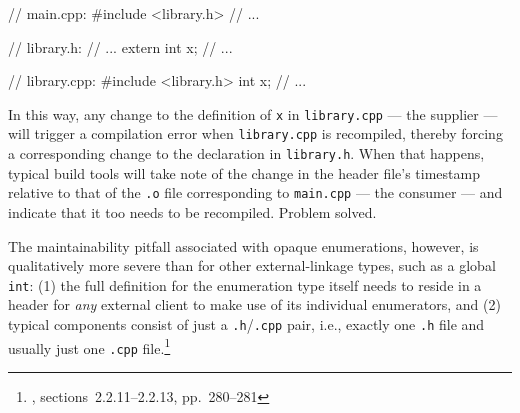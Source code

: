 \noindent\begin{minipage}{.3\textwidth}
\begin{emcppslisting}[emcppsbatch=e10]
// main.cpp:
#include <library.h>
// ...
\end{emcppslisting}
\end{minipage}\hfill
\begin{minipage}{.3\textwidth}
\begin{emcppslisting}[emcppsbatch=e10]
// library.h:
// ...
extern int x;
// ...
\end{emcppslisting}
\end{minipage}
\begin{minipage}{.3\textwidth}
\begin{emcppslisting}[emcppsbatch=e10]
// library.cpp:
#include <library.h>
int x;
// ...
\end{emcppslisting}
\end{minipage}

\noindent In this way, any change to the definition of \lstinline!x! in
\lstinline!library.cpp! --- the supplier --- will trigger a compilation error
when \lstinline!library.cpp! is recompiled, thereby forcing a corresponding
change to the declaration in \lstinline!library.h!. When that happens,
typical build tools will take note of the change in the header file's
timestamp relative to that of the \lstinline!.o! file corresponding to
\lstinline!main.cpp! --- the consumer --- and indicate that it too needs to be
recompiled. Problem solved.

The maintainability pitfall associated with opaque enumerations,
however, is qualitatively more severe than for other external-linkage
types, such as a global \lstinline!int!: (1) the full definition for the
enumeration type itself needs to reside in a header for \emph{any}
external client to make use of its individual enumerators, and (2)
typical components consist of just a \lstinline!.h!/\lstinline!.cpp! pair,
i.e., exactly one \lstinline!.h! file and usually just one \lstinline!.cpp!
file.{\cprotect\footnote{\cite{lakos20}, sections~2.2.11--2.2.13,
  pp.~280--281}}

